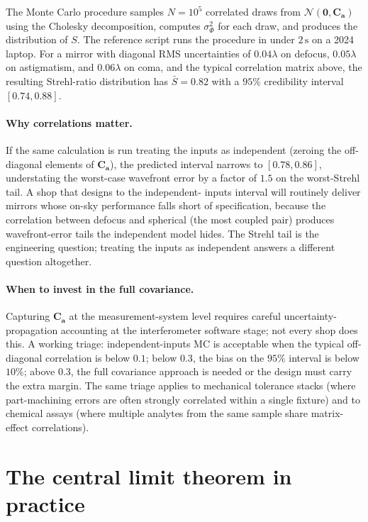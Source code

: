 The Monte Carlo procedure samples $N = 10^{5}$ correlated
draws from $\mathcal{N}(\mathbf{0}, \mathbf{C}_{\mathbf{a}})$
using the Cholesky decomposition, computes
$\sigma_{\Phi}^{2}$ for each draw, and produces the
distribution of $S$. The reference script
runs the procedure in under $2\,\si{\second}$ on a 2024
laptop. For a mirror with diagonal RMS uncertainties of $0.04
\lambda$ on defocus, $0.05\lambda$ on astigmatism, and $0.06
\lambda$ on coma, and the typical correlation matrix above,
the resulting Strehl-ratio distribution has $\bar{S} = 0.82$
with a $95\%$ credibility interval $[0.74, 0.88]$.

\paragraph{Why correlations matter.} If the same calculation
is run treating the inputs as independent (zeroing the
off-diagonal elements of $\mathbf{C}_{\mathbf{a}}$), the
predicted interval narrows to $[0.78, 0.86]$, understating the
worst-case wavefront error by a factor of $1.5$ on the
worst-Strehl tail. A shop that designs to the independent-
inputs interval will routinely deliver mirrors whose on-sky
performance falls short of specification, because the
correlation between defocus and spherical (the most coupled
pair) produces wavefront-error tails the independent model
hides. The Strehl tail is the engineering question; treating
the inputs as independent answers a different question
altogether.

\paragraph{When to invest in the full covariance.} Capturing
$\mathbf{C}_{\mathbf{a}}$ at the measurement-system level
requires careful uncertainty-propagation accounting at the
interferometer software stage; not every shop does this. A
working triage: independent-inputs MC is acceptable when the
typical off-diagonal correlation is below $0.1$; below $0.3$,
the bias on the $95\%$ interval is below $10\%$; above $0.3$,
the full covariance approach is needed or the design must
carry the extra margin. The same triage applies to mechanical
tolerance stacks (where part-machining errors are often
strongly correlated within a single fixture) and to chemical
assays (where multiple analytes from the same sample share
matrix-effect correlations).

\section{The central limit theorem in practice}

